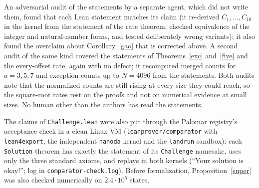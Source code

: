 \documentclass[11pt]{article}
\theoremstyle{remark}
\begin{document}
An adversarial audit of the statements by a separate agent, which did not write them, found that
each Lean statement matches its claim (it re-derived $C_1,\dots,C_{10}$ in the kernel from the
statement of the rate theorem, checked equivalence of the integer and natural-number forms, and
tested deliberately wrong variants); it also found the overclaim about Corollary~\ref{gao} that is
corrected above. A second audit of the same kind covered the statements of Theorems~\ref{exc} and~\ref{five} and
the every-offset rate, again with no defect; it recomputed merged counts for $a=3,5,7$ and
exception counts up to $N=4096$ from the statements. Both audits note that the normalized counts
are still rising at every size they could reach, so the square-root rates rest on the proofs and
not on numerical evidence at small sizes. No human other than the authors has read the statements.

The claims of \texttt{Challenge.lean} were also put through the Palomar registry's acceptance check
in a clean Linux VM (\texttt{leanprover/comparator} with \texttt{lean4export}, the independent
\texttt{nanoda} kernel and the \texttt{landrun} sandbox): each \texttt{Solution} theorem has exactly
the statement of its \texttt{Challenge} namesake, uses only the three standard axioms, and replays
in both kernels (``Your solution is okay!''; log in \texttt{comparator-check.log}). Before formalization,
Proposition~\ref{super} was also checked numerically on $2.4\cdot10^5$ states.
\end{document}
